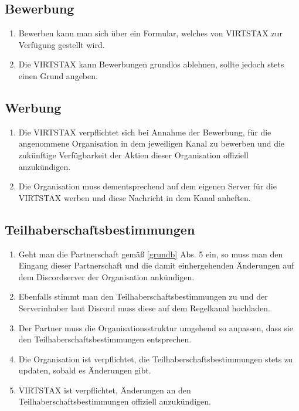 \documentclass{article}
\begin{document}
\subsection{Bewerbung}
\begin{enumerate}[(1)]
    \item Bewerben kann man sich über ein Formular, welches von VIRTSTAX zur Verfügung gestellt wird.
    \item Die VIRTSTAX kann Bewerbungen grundlos ablehnen, sollte jedoch stets einen Grund angeben.
\end{enumerate}

\subsection{Werbung}
\begin{enumerate}[(1)]
    \item Die VIRTSTAX verpflichtet sich bei Annahme der Bewerbung, für die angenommene Organisation in dem jeweiligen Kanal zu bewerben und die zukünftige Verfügbarkeit der Aktien dieser Organisation offiziell anzukündigen.
    \item Die Organisation muss dementsprechend auf dem eigenen Server für die VIRTSTAX werben und diese Nachricht in dem Kanal anheften.
\end{enumerate}

\subsection{Teilhaberschaftsbestimmungen}
\begin{enumerate}[(1)]
    \item Geht man die Partnerschaft gemäß \ref{grundb} Abs. 5 ein, so muss man den Eingang dieser Partnerschaft und die damit einhergehenden Änderungen auf dem Discordserver der Organisation ankündigen.
    \item Ebenfalls stimmt man den Teilhaberschaftsbestimmungen zu und der Serverinhaber laut Discord muss diese auf dem Regelkanal hochladen.
    \item Der Partner muss die Organisationsstruktur umgehend so anpassen, dass sie den Teilhaberschaftsbestimmungen entsprechen.
    \item Die Organisation ist verpflichtet, die Teilhaberschaftsbestimmungen stets zu updaten, sobald es Änderungen gibt.
    \item VIRTSTAX ist verpflichtet, Änderungen an den Teilhaberschaftsbestimmungen offiziell anzukündigen.
\end{enumerate}
\end{document}
